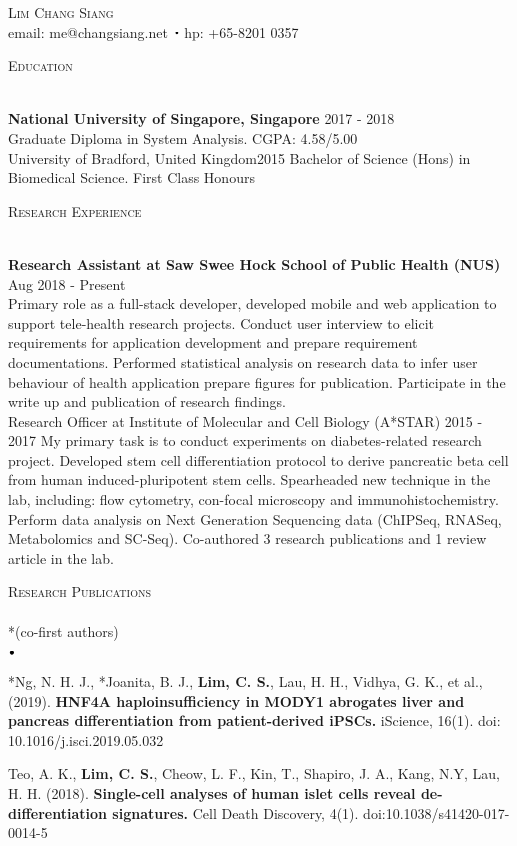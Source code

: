 \documentclass[11pt]{article}
\newcommand{\lineunder}{\vspace*{-8pt} \\ \hspace*{-18pt} \hrulefill \\}
\newcommand{\header}[1]{{\hspace*{-15pt}\vspace*{6pt} \textsc{#1}} \vspace*{-6pt} \lineunder}
\newcommand{\contact}[2]{
\begin{center}
{\LARGE \scshape {#1}}\\
#2
\end{center}
\vspace*{-8pt}
}
\newcommand{\sbt}{\,\begin{picture}(-1,1)(-1,-3)\circle*{2}\end{picture}\ }
\newcommand{\lbt}{\,\begin{picture}(-1,1)(-1,-3)\circle*{3}\end{picture}\ }
\newenvironment{achievements}{
    \begin{list}{$\lbt$}{
        \topsep 0pt
        \itemsep 0pt
        \addtolength{\leftmargin}{-0.1in}
    }
}
{
    \vspace*{4pt}
    \end{list}
}
\newcommand{\schoolwithcourses}[4]{
 \textbf{#1} \hfill{#2}\\
    #3\\
\vspace*{5pt}
}
\begin{document}

\small
\smallskip
\vspace*{-35pt}

\contact{Lim Chang Siang}
{email: me@changsiang.net $\sbt$ hp: +65-8201 0357}

\header{Education}
\vspace{2mm}
\schoolwithcourses{National University of Singapore, Singapore}{2017 - 2018}
{Graduate Diploma in System Analysis. CGPA: 4.58/5.00}

\schoolwithcourses{University of Bradford, United Kingdom}{2015}
{Bachelor of Science (Hons) in Biomedical Science. First Class Honours}
\hfill{}


\header{Research Experience}
\vspace{2mm}
\schoolwithcourses{Research Assistant at Saw Swee Hock School of Public Health (NUS)}{ Aug 2018 - Present}
{Primary role as a full-stack developer, developed mobile and web application to support tele-health 
research projects. Conduct user interview to elicit requirements for application development and 
prepare requirement documentations. Performed statistical analysis on research data to infer 
user behaviour of health application prepare figures for publication. 
Participate in the write up and publication of research findings.}

\schoolwithcourses{Research Officer at Institute of Molecular and Cell Biology (A*STAR)}{
2015 - 2017}
{My primary task is to conduct experiments on diabetes-related research project. 
Developed stem cell differentiation protocol to derive pancreatic beta cell from 
human induced-pluripotent stem cells. Spearheaded new technique in the lab, including: 
flow cytometry, con-focal microscopy and immunohistochemistry. Perform data analysis on 
Next Generation Sequencing data (ChIPSeq, RNASeq, Metabolomics and SC-Seq). 
Co-authored 3 research publications and 1 review article in the lab.}
\hfill{}

\header{Research Publications} {*(co-first authors)}
\vspace{2mm}
\begin{achievements}
\justifying
\item {*Ng, N. H. J., *Joanita, B. J., \textbf{Lim, C. S.}, Lau, H. H., Vidhya, G. K., et al., (2019). 
\textbf{HNF4A haploinsufficiency in MODY1 abrogates liver and pancreas differentiation from 
patient-derived iPSCs.} iScience, 16(1). doi: 10.1016/j.isci.2019.05.032}
\item {Teo, A. K., \textbf{Lim, C. S.}, Cheow, L. F., Kin, T., Shapiro, J. A., Kang, N.Y, Lau, H. H. (2018). 
\textbf{Single-cell analyses of human islet cells reveal de-differentiation signatures.} 
Cell Death Discovery, 4(1). doi:10.1038/s41420-017-0014-5}
\end{achievements}
\hfill{}
\end{document}
